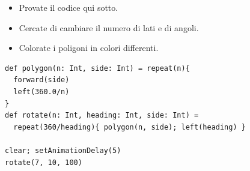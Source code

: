 \begin{itemize}

\item {Provate il codice qui sotto.}
\item {Cercate di cambiare il numero di lati e di angoli.}
\item {Colorate i poligoni in colori differenti.}

\end{itemize}



  

\begin{lstlisting}[basicstyle={\ttfamily\fontsize{16}{19}\selectfont},numbers=none]
def polygon(n: Int, side: Int) = repeat(n){
  forward(side)
  left(360.0/n)
}
def rotate(n: Int, heading: Int, side: Int) = 
  repeat(360/heading){ polygon(n, side); left(heading) }

clear; setAnimationDelay(5)
rotate(7, 10, 100)
\end{lstlisting}
        
